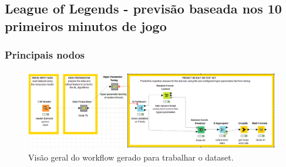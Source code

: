 \subsection{League of Legends - previsão baseada nos 10 primeiros minutos de jogo}
    \subsubsection{Principais nodos}
        \begin{figure}[H]
            \centering
            \includegraphics[scale=0.30
            ]{Figures/wf_lol.png}
            \caption{Visão geral do workflow gerado para trabalhar o dataset.}
            \label{fig:"um"}
        \end{figure} 
        
